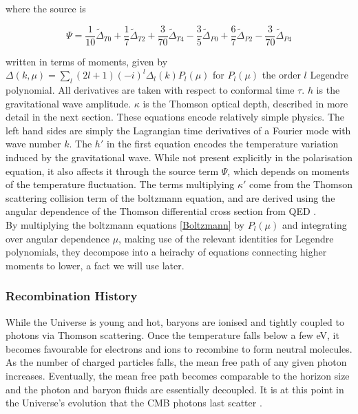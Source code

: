 \documentclass[a4paper,10pt]{article}
\begin{document}
where the source is

\begin{equation}
\Psi = \frac{1}{10}\tilde{\Delta}_{T0} + \frac{1}{7}\tilde{\Delta}_{T2} + \frac{3}{70}\tilde{\Delta}_{T4} - \frac{3}{5}\tilde{\Delta}_{P0} + \frac{6}{7}\tilde{\Delta}_{P2} - \frac{3}{70}\tilde{\Delta}_{P4}
\end{equation}

written in terms of moments, given by $\Delta(k, \mu) = \sum_l (2l+1)(-i)^l\Delta_l(k)P_l(\mu)$ for $P_l(\mu)$ the order $l$ Legendre polynomial. All derivatives are taken with respect to conformal time $\tau$. $h$ is the gravitational wave amplitude. $\kappa$ is the Thomson optical depth, described in more detail in the next section. These equations encode relatively simple physics. The left hand sides are simply the Lagrangian time derivatives of a Fourier mode with wave number $k$. The $h'$ in the first equation encodes the temperature variation induced by the gravitational wave. While not present explicitly in the polarisation equation, it also affects it through the source term $\Psi$, which depends on moments of the temperature fluctuation. The terms multiplying $\kappa'$ come from the Thomson scattering collision term of the boltzmann equation, and are derived using the angular dependence of the Thomson differential cross section from QED \cite{QBM, kowosky}. \\


By multiplying the boltzmann equations \ref{Boltzmann} by $P_l(\mu)$ and integrating over angular dependence $\mu$, making use of the relevant identities for Legendre polynomials, they decompose into a heirachy of equations connecting higher moments to lower, a fact we will use later.

\subsubsection{Recombination History}

While the Universe is young and hot, baryons are ionised and tightly coupled to photons via Thomson scattering. Once the temperature falls below a few eV, it becomes favourable for electrons and ions to recombine to form neutral molecules. As the number of charged particles falls, the mean free path of any given photon increases. Eventually, the mean free path becomes comparable to the horizon size and the photon and baryon fluids are essentially decoupled. It is at this point in the Universe’s evolution that the CMB photons last scatter \cite{Pritchard}.\\
\end{document}
